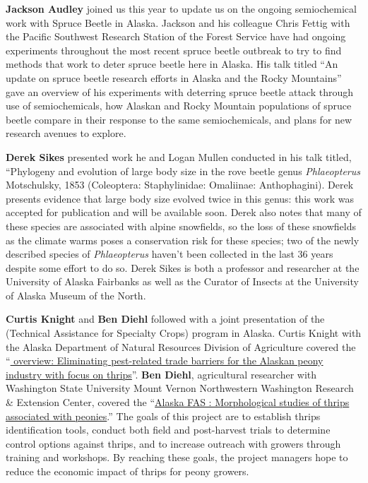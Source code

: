 \begin{multicols}{2}
\textbf{Jackson Audley} joined us this year to update us on the ongoing semiochemical work with Spruce Beetle in Alaska. Jackson and his colleague Chris Fettig with the Pacific Southwest Research Station of the  Forest Service have had ongoing experiments throughout the most recent spruce beetle outbreak to try to find methods that work to deter spruce beetle here in Alaska. His talk titled ``An update on spruce beetle research efforts in Alaska and the Rocky Mountains'' gave an overview of his experiments with deterring spruce beetle attack through use of semiochemicals, how Alaskan and Rocky Mountain populations of spruce beetle compare in their response to the same semiochemicals, and plans for new research avenues to explore.

\textbf{Derek Sikes} presented work he and Logan Mullen conducted in his talk titled, ``Phylogeny and evolution of large body size in the rove beetle genus \textit{Phlaeopterus} Motschulsky, 1853 (Coleoptera: Staphylinidae: Omaliinae: Anthophagini). Derek presents evidence that large body size evolved twice in this genus: this work was accepted for publication and will be available soon. Derek also notes that many of these species are associated with alpine snowfields, so the loss of these snowfields as the climate warms poses a conservation risk for these species; two of the newly described species of \textit{Phlaeopterus} haven’t been collected in the last 36 years despite some effort to do so. Derek Sikes is both a professor and researcher at the University of Alaska Fairbanks as well as the Curator of Insects at the University of Alaska Museum of the North. 

\textbf{Curtis Knight} and \textbf{Ben Diehl} followed with a joint presentation of the   (Technical Assistance for Specialty Crops) program in Alaska. Curtis Knight with the Alaska Department of Natural Resources Division of Agriculture covered the ``\href{http://www.akentsoc.org/doc/Knight_C_and_B_Diehl_2021.pdf}{ overview: Eliminating pest-related trade barriers for the Alaskan peony industry with focus on thrips}''. \textbf{Ben Diehl}, agricultural researcher with Washington State University Mount Vernon Northwestern Washington Research \& Extension Center, covered the ``\href{http://www.akentsoc.org/doc/Knight_C_and_B_Diehl_2021.pdf}{Alaska  FAS : Morphological studies of thrips associated with peonies}.'' The goals of this project are to establish thrips identification tools, conduct both field and post-harvest trials to determine control options against thrips, and to increase outreach with growers through training and workshops. By reaching these goals, the  project managers hope to reduce the economic impact of thrips for peony growers. 


\end{multicols}

